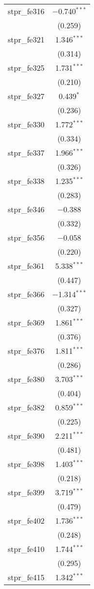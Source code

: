 \begin{table}[!htbp]
\begin{tabular}{@{\extracolsep{5pt}}lc}
  stpr\_fe316 & $-$0.740$^{***}$ \\ 
  & (0.259) \\ 
  stpr\_fe321 & 1.346$^{***}$ \\ 
  & (0.314) \\ 
  stpr\_fe325 & 1.731$^{***}$ \\ 
  & (0.210) \\ 
  stpr\_fe327 & 0.439$^{*}$ \\ 
  & (0.236) \\ 
  stpr\_fe330 & 1.772$^{***}$ \\ 
  & (0.334) \\ 
  stpr\_fe337 & 1.966$^{***}$ \\ 
  & (0.326) \\ 
  stpr\_fe338 & 1.235$^{***}$ \\ 
  & (0.283) \\ 
  stpr\_fe346 & $-$0.388 \\ 
  & (0.332) \\ 
  stpr\_fe356 & $-$0.058 \\ 
  & (0.220) \\ 
  stpr\_fe361 & 5.338$^{***}$ \\ 
  & (0.447) \\ 
  stpr\_fe366 & $-$1.314$^{***}$ \\ 
  & (0.327) \\ 
  stpr\_fe369 & 1.861$^{***}$ \\ 
  & (0.376) \\ 
  stpr\_fe376 & 1.811$^{***}$ \\ 
  & (0.286) \\ 
  stpr\_fe380 & 3.703$^{***}$ \\ 
  & (0.404) \\ 
  stpr\_fe382 & 0.859$^{***}$ \\ 
  & (0.225) \\ 
  stpr\_fe390 & 2.211$^{***}$ \\ 
  & (0.481) \\ 
  stpr\_fe398 & 1.403$^{***}$ \\ 
  & (0.218) \\ 
  stpr\_fe399 & 3.719$^{***}$ \\ 
  & (0.479) \\ 
  stpr\_fe402 & 1.736$^{***}$ \\ 
  & (0.248) \\ 
  stpr\_fe410 & 1.744$^{***}$ \\ 
  & (0.295) \\ 
  stpr\_fe415 & 1.342$^{***}$ \\ 

\end{tabular}
\end{table}
